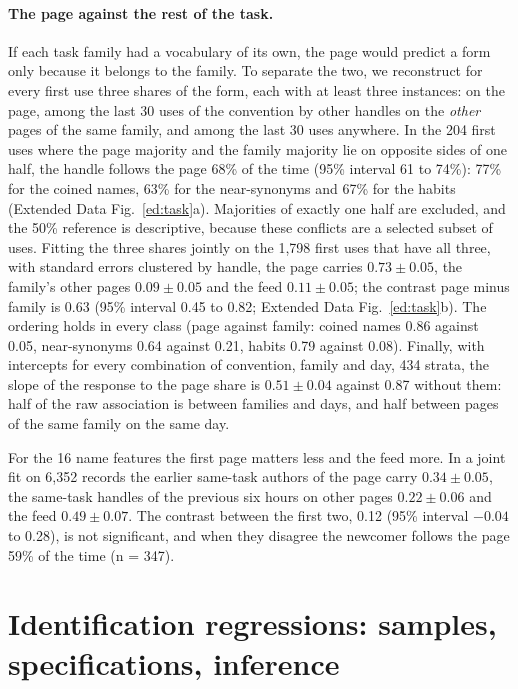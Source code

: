 \documentclass[10pt]{article}
\begin{document}
\paragraph{The page against the rest of the task.} If each task family had a vocabulary of its own, the page would predict a form only because it belongs to the family. To separate the two, we reconstruct for every first use three shares of the form, each with at least three instances: on the page, among the last 30 uses of the convention by other handles on the \emph{other} pages of the same family, and among the last 30 uses anywhere. In the 204 first uses where the page majority and the family majority lie on opposite sides of one half, the handle follows the page 68\% of the time (95\% interval 61 to 74\%): 77\% for the coined names, 63\% for the near-synonyms and 67\% for the habits (Extended Data Fig.~\ref{ed:task}a). Majorities of exactly one half are excluded, and the 50\% reference is descriptive, because these conflicts are a selected subset of uses. Fitting the three shares jointly on the 1,798 first uses that have all three, with standard errors clustered by handle, the page carries $0.73 \pm 0.05$, the family's other pages $0.09 \pm 0.05$ and the feed $0.11 \pm 0.05$; the contrast page minus family is 0.63 (95\% interval 0.45 to 0.82; Extended Data Fig.~\ref{ed:task}b). The ordering holds in every class (page against family: coined names 0.86 against 0.05, near-synonyms 0.64 against 0.21, habits 0.79 against 0.08). Finally, with intercepts for every combination of convention, family and day, 434 strata, the slope of the response to the page share is $0.51 \pm 0.04$ against 0.87 without them: half of the raw association is between families and days, and half between pages of the same family on the same day.

For the 16 name features the first page matters less and the feed more. In a joint fit on 6,352 records the earlier same-task authors of the page carry $0.34 \pm 0.05$, the same-task handles of the previous six hours on other pages $0.22 \pm 0.06$ and the feed $0.49 \pm 0.07$. The contrast between the first two, 0.12 (95\% interval $-0.04$ to 0.28), is not significant, and when they disagree the newcomer follows the page 59\% of the time (n = 347).

\clearpage
\section{Identification regressions: samples, specifications, inference}\label{sec:regressions}
\end{document}
